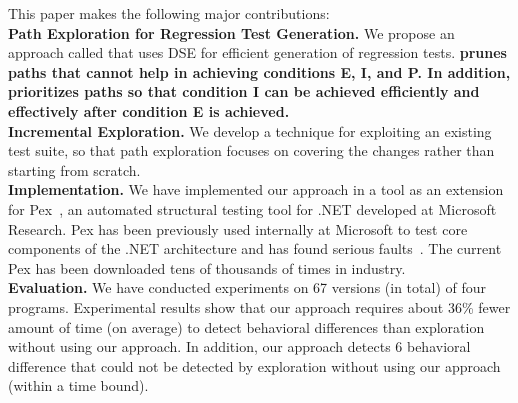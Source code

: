 {

This paper makes the following major contributions:
\\ \textbf{Path Exploration for Regression Test Generation.} We propose an approach called  that uses DSE for efficient generation of regression tests. 
\textbf{ prunes paths that cannot help in achieving conditions E, I, and P.
In addition,  prioritizes paths so that condition I can be achieved efficiently and effectively
after condition E is achieved.} 
\\ \textbf{Incremental Exploration.} We develop a technique for exploiting an existing test suite, so that path exploration focuses on covering the changes rather than starting from scratch. 
\\ \textbf{Implementation.} We have implemented our  approach in a tool as an extension for Pex~\cite{Pex},  an automated structural testing tool for .NET developed at Microsoft Research. Pex has been previously used internally at Microsoft to test core components of the .NET architecture and has found serious
faults~\cite{Pex}. The current Pex has been downloaded tens of thousands of times in industry. 
\\ \textbf{Evaluation.} We have conducted experiments on 67 versions (in total) of four programs. 
Experimental results show that our approach requires about 36\% fewer amount of time (on average) to detect behavioral differences than exploration without using our approach. In addition, our approach detects 6 behavioral difference that could not be detected by exploration without using our approach (within a time bound).
}
